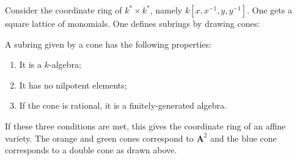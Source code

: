 \documentclass[11pt, oneside,margin=1in]{article}
\begin{document}
\begin{example}\label{}\text{}
Consider the coordinate ring of $k^*\times k^*$, namely $k[x,x^{-1},y,y^{-1}]$. One gets a square lattice of monomials. One defines subrings by drawing cones:
\begin{center}
\end{center}
A subring given by a cone has the following properties:
\begin{enumerate}
	\item It is a $k$-algebra;
	\item It has no nilpotent elements;
	\item If the cone is rational, it is a finitely-generated algebra.
\end{enumerate}
If these three conditions are met, this gives the coordinate ring of an affine variety. The orange and green cones correspond to $\mathbf{A}^2$ and the blue cone corresponds to a double cone as drawn above. 


\end{example}
\end{document}
